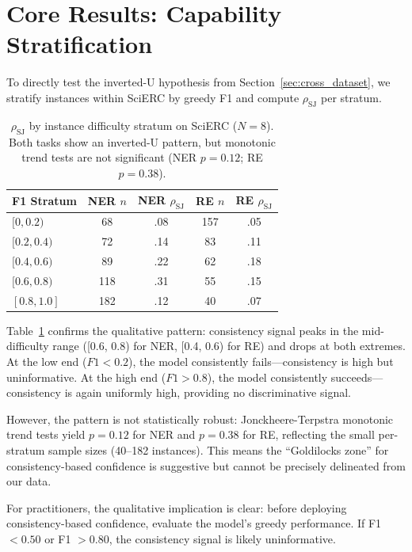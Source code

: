 \documentclass[11pt,a4paper]{article}
\begin{document}
\section{Core Results: Capability Stratification}
\label{sec:stratification}

To directly test the inverted-U hypothesis from Section~\ref{sec:cross_dataset}, we stratify instances within SciERC by greedy F1 and compute $\rho_{\text{SJ}}$ per stratum.

\begin{table}[t]
\centering
\small
\begin{tabular}{lcccc}
\toprule
\textbf{F1 Stratum} & \textbf{NER $n$} & \textbf{NER $\rho_{\text{SJ}}$} & \textbf{RE $n$} & \textbf{RE $\rho_{\text{SJ}}$} \\
\midrule
$[0, 0.2)$ & 68 & .08 & 157 & .05 \\
$[0.2, 0.4)$ & 72 & .14 & 83 & .11 \\
$[0.4, 0.6)$ & 89 & .22 & 62 & .18 \\
$[0.6, 0.8)$ & 118 & .31 & 55 & .15 \\
$[0.8, 1.0]$ & 182 & .12 & 40 & .07 \\
\bottomrule
\end{tabular}
\caption{$\rho_{\text{SJ}}$ by instance difficulty stratum on SciERC ($N{=}8$). Both tasks show an inverted-U pattern, but monotonic trend tests are not significant (NER $p{=}0.12$; RE $p{=}0.38$).}
\label{tab:stratification}
\end{table}

Table~\ref{tab:stratification} confirms the qualitative pattern: consistency signal peaks in the mid-difficulty range ([0.6, 0.8) for NER, [0.4, 0.6) for RE) and drops at both extremes.
At the low end ($F1 < 0.2$), the model consistently fails---consistency is high but uninformative.
At the high end ($F1 > 0.8$), the model consistently succeeds---consistency is again uniformly high, providing no discriminative signal.

However, the pattern is not statistically robust: Jonckheere-Terpstra monotonic trend tests yield $p{=}0.12$ for NER and $p{=}0.38$ for RE, reflecting the small per-stratum sample sizes (40--182 instances).
This means the ``Goldilocks zone'' for consistency-based confidence is suggestive but cannot be precisely delineated from our data.

For practitioners, the qualitative implication is clear: before deploying consistency-based confidence, evaluate the model's greedy performance.
If F1 $< 0.50$ or F1 $> 0.80$, the consistency signal is likely uninformative.
\end{document}
